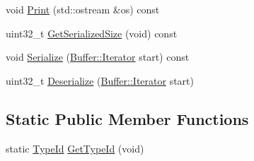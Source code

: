 \begin{DoxyCompactItemize}
\item 
void \hyperlink{classns3_1_1MgtProbeRequestHeader_a7a57a5dd5173171aecb015d2949d2664}{Print} (std\+::ostream \&os) const 
\item 
uint32\+\_\+t \hyperlink{classns3_1_1MgtProbeRequestHeader_a558816dce9132977b9931fae7ce79c06}{Get\+Serialized\+Size} (void) const 
\item 
void \hyperlink{classns3_1_1MgtProbeRequestHeader_afa7d6bcf7c03df0927635a07cfff6d13}{Serialize} (\hyperlink{classns3_1_1Buffer_1_1Iterator}{Buffer\+::\+Iterator} start) const 
\item 
uint32\+\_\+t \hyperlink{classns3_1_1MgtProbeRequestHeader_a622524bcbe9ec5ba9bea8e83c43302db}{Deserialize} (\hyperlink{classns3_1_1Buffer_1_1Iterator}{Buffer\+::\+Iterator} start)
\end{DoxyCompactItemize}
\subsection*{Static Public Member Functions}
\begin{DoxyCompactItemize}
\item 
static \hyperlink{classns3_1_1TypeId}{Type\+Id} \hyperlink{classns3_1_1MgtProbeRequestHeader_a87c49292b9c92b7d57355b017d020e51}{Get\+Type\+Id} (void)
\end{DoxyCompactItemize}
